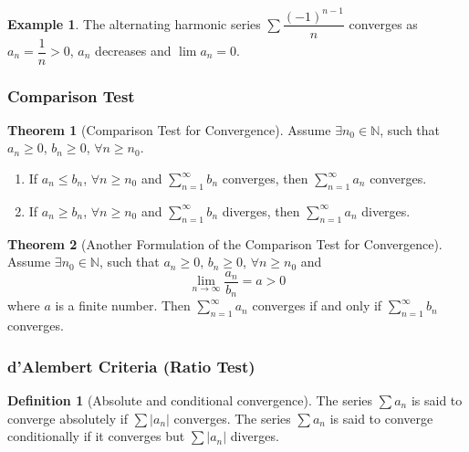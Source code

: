 \documentclass[fleqn, a4paper, 12pt, twoside]{article}
\theoremstyle{definition}
\newtheorem{example}{Example}
\newtheorem{definition}{Definition}
\theoremstyle{theorem}
\newtheorem{theorem}{Theorem}
\begin{document}
{\begin{example}
	The alternating harmonic series $\sum \dfrac{(-1)^{n - 1}}{n}$ converges as $a_n = \dfrac{1}{n} > 0$, $a_n$ decreases and $\lim a_n = 0$.
\end{example}

\subsubsection{Comparison Test}

\begin{theorem}[Comparison Test for Convergence]
	Assume $\exists n_0 \in \mathbb{N}$, such that $a_n \ge 0$, $b_n \ge 0$, $\forall n \ge n_0$.
	\begin{enumerate}
		\item If $a_n \le b_n$, $\forall n \ge n_0$ and $\sum\limits_{n = 1}^{\infty} b_n$ converges, then $\sum\limits_{n = 1}^{\infty} a_n$ converges.
		\item If $a_n \ge b_n$, $\forall n \ge n_0$ and $\sum\limits_{n = 1}^{\infty} b_n$ diverges, then $\sum\limits_{n = 1}^{\infty} a_n$ diverges.
	\end{enumerate}
	\label{Comparison Test for Convergence}
\end{theorem}

\begin{theorem}[Another Formulation of the Comparison Test for Convergence]
	Assume $\exists n_0 \in \mathbb{N}$, such that $a_n \ge 0$, $b_n \ge 0$, $\forall n \ge n_0$ and
	\begin{equation*}
		\lim\limits_{n \to \infty} \dfrac{a_n}{b_n} = a > 0
	\end{equation*}
	where $a$ is a finite number. Then $\sum\limits_{n = 1}^{\infty} a_n$ converges if and only if $\sum\limits_{n = 1}^{\infty} b_n$ converges.
	\label{Another Formulation of the Comparison Test for Convergence}
\end{theorem}

\subsubsection{d'Alembert Criteria (Ratio Test)}

\begin{definition}[Absolute and conditional convergence]
	The series $\sum a_n$ is said to converge absolutely if $\sum |a_n|$ converges.
	The series $\sum a_n$ is said to converge conditionally if it converges but $\sum |a_n|$ diverges.
\end{definition}

}
\end{document}
